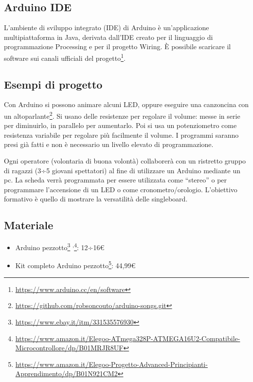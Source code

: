 \documentclass[a4paper]{article}
\begin{document}
\subsection{Arduino IDE}%
\label{subsec:arduino_ide}

L'ambiente di sviluppo integrato (IDE) di Arduino è un'applicazione
multipiattaforma in Java, derivata dall'IDE creato per il linguaggio di
programmazione Processing e per il progetto Wiring. È possibile scaricare il
software sui canali ufficiali del progetto\footnote{
  \url{https://www.arduino.cc/en/software} }.

\subsection{Esempi di progetto}%
\label{subsec:arduino_esempi}

Con Arduino si possono animare alcuni LED, oppure eseguire una canzoncina con un
altoparlante\footnote{ \url{https://github.com/robsoncouto/arduino-songs.git} }.
Si usano delle resistenze per regolare il volume: messe in serie per diminuirlo,
in parallelo per aumentarlo. Poi si usa un potenziometro come resistenza
variabile per regolare più facilmente il volume. I programmi saranno presi già
fatti e non è necessario un livello elevato di programmazione.

Ogni operatore (volontaria di buona volontà) collaborerà con un ristretto gruppo
di ragazzi (3÷5 giovani spettatori) al fine di utilizzare un Arduino mediante un
pc. La scheda verrà programmata per essere utilizzata come ``stereo'' o per
programmare l'accensione di un LED o come cronometro/orologio. L'obiettivo
formativo è quello di mostrare la versatilità delle singleboard.

\subsection{Materiale}%
\label{subsec:arduino-materiale}

\begin{itemize}
  \item Arduino pezzotto\footnote{ \url{https://www.ebay.it/itm/331535576930} }%
        \textsuperscript{,}\footnote{
        \url{https://www.amazon.it/Elegoo-ATmega328P-ATMEGA16U2-Compatibile-Microcontrollore/dp/B01MRJR8UF}
        }: 12÷16€
  \item Kit completo Arduino pezzotto\footnote{
        \url{https://www.amazon.it/Elegoo-Progetto-Advanced-Principianti-Apprendimento/dp/B01N921CM2}
        }: 44,99€
\end{itemize}
\end{document}
